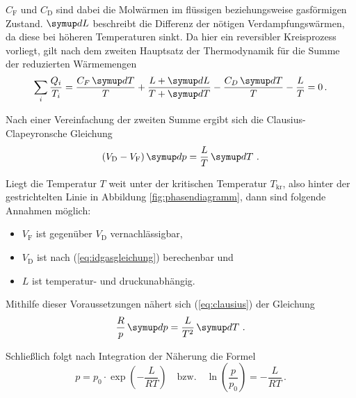 $C_\text{F}$ und $C_\text{D}$ sind dabei die Molwärmen im flüssigen beziehungsweise gasförmigen Zustand.
$\dif{L}$ beschreibt die Differenz der nötigen Verdampfungswärmen, da diese bei höheren Temperaturen sinkt.
Da hier ein reversibler Kreisprozess vorliegt, gilt nach dem zweiten Hauptsatz der Thermodynamik für 
die Summe der reduzierten Wärmemengen
\begin{equation}
    \sum_{i} \frac{Q_{i}}{T_{i}} = 
    \frac {C_{F}\dif{T}} {T} + \frac {L+\dif{L}} {T+\dif{T}} - \frac {C_{D}\dif{T}} {T}-\frac{L}{T} =
    0 \, .
\end{equation}

Nach einer Vereinfachung der zweiten Summe ergibt sich die Clausius-Clapeyronsche Gleichung
\begin{equation}
    \left(V_{\text{D}}-V_{\text{F}}\right) \dif{p} = \frac{L}{T} \dif{T} \, . 
    \label{eq:clausius}
\end{equation}

Liegt die Temperatur $T$ weit unter der kritischen Temperatur $T_\text{kr}$, also hinter der gestrichtelten Linie in Abbildung \ref{fig:phasendiagramm},
dann sind folgende Annahmen möglich:
\begin{itemize}
    \item $V_\text{F}$ ist gegenüber $V_\text{D}$ vernachlässigbar,
    \item $V_\text{D}$ ist nach (\ref{eq:idgasgleichung}) berechenbar und
    \item $L$ ist temperatur- und druckunabhängig.
\end{itemize}

Mithilfe dieser Voraussetzungen nähert sich (\ref{eq:clausius}) der Gleichung
\begin{equation}
    \frac{R}{p} \dif{p} = \frac{L}{T^2} \dif{T} \, . 
    \label{eq:approxclausius}
\end{equation}

Schließlich folgt nach Integration der Näherung die Formel
\begin{equation}
    p = p_{0} \cdot \exp \left(-\frac{L}{R T}\right) \quad \text{bzw.} \quad \ln \left(\frac{p}{p_{0}}\right) = -\frac{L}{R T} \, .
    \label{eq:damppfdruck}
\end{equation}